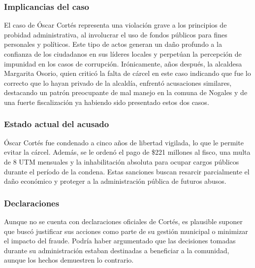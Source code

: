 \documentclass[letter,12pt]{article}
\begin{document}
	\subsubsection{Implicancias del caso}
	El caso de Óscar Cortés representa una violación grave a los principios de probidad administrativa, al involucrar el uso de fondos públicos para fines personales y políticos. Este tipo de actos generan un daño profundo a la confianza de los ciudadanos en sus líderes locales y perpetúan la percepción de impunidad en los casos de corrupción. Irónicamente, años después, la alcaldesa Margarita Osorio, quien criticó la falta de cárcel en este caso indicando que fue lo correcto que lo hayan privado de la alcaldía, enfrentó acusaciones similares, destacando un patrón preocupante de mal manejo en la comuna de Nogales y de una fuerte fiscalización ya habiendo sido presentado estos dos casos.\cite{oscar2}\\
	
	\subsubsection{Estado actual del acusado}
	Óscar Cortés fue condenado a cinco años de libertad vigilada, lo que le permite evitar la cárcel. Además, se le ordenó el pago de \$221 millones al fisco, una multa de 8 UTM mensuales y la inhabilitación absoluta para ocupar cargos públicos durante el período de la condena. Estas sanciones buscan resarcir parcialmente el daño económico y proteger a la administración pública de futuros abusos.\cite{oscar3}\\
	
	\subsubsection{Declaraciones}
	Aunque no se cuenta con declaraciones oficiales de Cortés, es plausible suponer que buscó justificar sus acciones como parte de su gestión municipal o minimizar el impacto del fraude. Podría haber argumentado que las decisiones tomadas durante su administración estaban destinadas a beneficiar a la comunidad, aunque los hechos demuestren lo contrario.
	
\end{document}
